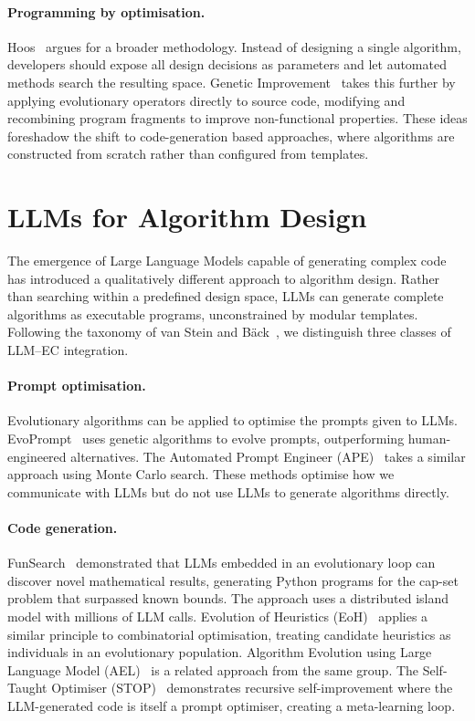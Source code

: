 \paragraph{Programming by optimisation.}
Hoos~\cite{hoos2012pbo} argues for a broader methodology. Instead of designing a single algorithm, developers should expose all design decisions as parameters and let automated methods search the resulting space. Genetic Improvement~\cite{petke2018gi} takes this further by applying evolutionary operators directly to source code, modifying and recombining program fragments to improve non-functional properties. These ideas foreshadow the shift to code-generation based approaches, where algorithms are constructed from scratch rather than configured from templates.

\section{LLMs for Algorithm Design}
\label{sec:bg-llm-aad}

The emergence of Large Language Models capable of generating complex code has introduced a qualitatively different approach to algorithm design. Rather than searching within a predefined design space, LLMs can generate complete algorithms as executable programs, unconstrained by modular templates. Following the taxonomy of van Stein and B\"ack~\cite{vanStein2024LLaMEA}, we distinguish three classes of LLM--EC integration.

\paragraph{Prompt optimisation.}
Evolutionary algorithms can be applied to optimise the prompts given to LLMs. EvoPrompt~\cite{guo2024evoprompt} uses genetic algorithms to evolve prompts, outperforming human-engineered alternatives. The Automated Prompt Engineer (APE)~\cite{zhou2023ape} takes a similar approach using Monte Carlo search. These methods optimise how we communicate with LLMs but do not use LLMs to generate algorithms directly.

\paragraph{Code generation.}
FunSearch~\cite{romeraparedes2024funsearch} demonstrated that LLMs embedded in an evolutionary loop can discover novel mathematical results, generating Python programs for the cap-set problem that surpassed known bounds. The approach uses a distributed island model with millions of LLM calls. Evolution of Heuristics (EoH)~\cite{liu2024eoh} applies a similar principle to combinatorial optimisation, treating candidate heuristics as individuals in an evolutionary population. Algorithm Evolution using Large Language Model (AEL)~\cite{liu2023ael} is a related approach from the same group. The Self-Taught Optimiser (STOP)~\cite{zelikman2024stop} demonstrates recursive self-improvement where the LLM-generated code is itself a prompt optimiser, creating a meta-learning loop.

